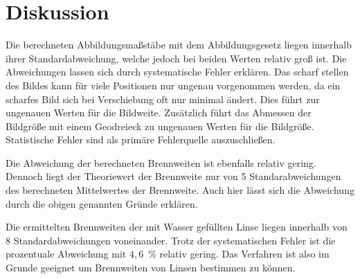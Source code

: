 \section{Diskussion}
\label{sec:Diskussion}
Die berechneten Abbildungsmaßstäbe mit dem Abbildungsgesetz liegen innerhalb ihrer Standardabweichung, welche
jedoch bei beiden Werten relativ groß ist. Die Abweichungen lassen sich durch systematische Fehler erklären.
Das scharf stellen des Bildes kann für viele Positionen nur ungenau vorgenommen werden, da ein
scharfes Bild sich bei Verschiebung oft nur minimal ändert. Dies führt zur ungenauen Werten für die Bildweite.
Zusätzlich führt das Abmessen der Bildgröße mit einem Geodreieck zu ungenauen Werten für die Bildgröße.
Statistische Fehler sind als primäre Fehlerquelle auszuschließen.

Die Abweichung der berechneten Brennweiten ist ebenfalls relativ gering. Dennoch liegt der
Theoriewert der Brennweite nur von 5 Standarabweichungen des berechneten Mittelwertes der Brennweite. Auch hier lässt
sich die Abweichung durch die obigen genannten Gründe erklären.

Die ermittelten Brennweiten der mit Wasser gefüllten Linse liegen innerhalb von 8 Standardabweichungen voneinander.
Trotz der systematischen Fehler ist die prozentuale Abweichung mit $4,6$\, \% relativ gering.
Das Verfahren ist also im Grunde geeignet um Brennweiten von Linsen bestimmen zu können. 
